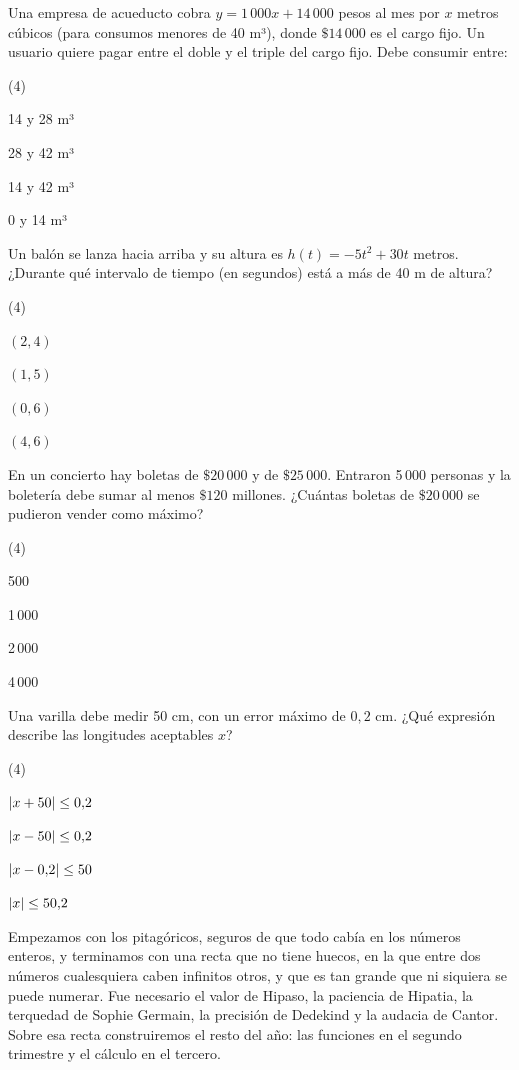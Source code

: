 \documentclass[11pt]{article}
\begin{document}
\begin{preguntas}
\pregunta Una empresa de acueducto cobra $y = 1\,000x + 14\,000$ pesos al mes por
$x$ metros cúbicos (para consumos menores de 40 m³), donde $\$14\,000$ es el cargo
fijo. Un usuario quiere pagar entre el doble y el triple del cargo fijo. Debe
consumir entre:
\begin{opciones*}(4)
  \item 14 y 28 m³
  \item 28 y 42 m³
  \item 14 y 42 m³
  \item 0 y 14 m³
\end{opciones*}
\pregunta Un balón se lanza hacia arriba y su altura es $h(t) = -5t^2 + 30t$ metros.
¿Durante qué intervalo de tiempo (en segundos) está a más de 40 m de altura?
\begin{opciones*}(4)
  \item $(2, 4)$
  \item $(1, 5)$
  \item $(0, 6)$
  \item $(4, 6)$
\end{opciones*}
\pregunta En un concierto hay boletas de $\$20\,000$ y de $\$25\,000$. Entraron
5\,000 personas y la boletería debe sumar al menos $\$120$ millones. ¿Cuántas
boletas de $\$20\,000$ se pudieron vender como máximo?
\begin{opciones*}(4)
  \item 500
  \item 1\,000
  \item 2\,000
  \item 4\,000
\end{opciones*}
\pregunta Una varilla debe medir 50 cm, con un error máximo de $0{,}2$ cm. ¿Qué
expresión describe las longitudes aceptables $x$?
\begin{opciones*}(4)
  \item $\lvert x + 50\rvert \le 0{,}2$
  \item $\lvert x - 50\rvert \le 0{,}2$
  \item $\lvert x - 0{,}2\rvert \le 50$
  \item $\lvert x\rvert \le 50{,}2$
\end{opciones*}
\end{preguntas}


Empezamos con los pitagóricos, seguros de que todo cabía en los números enteros, y
terminamos con una recta que no tiene huecos, en la que entre dos números
cualesquiera caben infinitos otros, y que es tan grande que ni siquiera se puede
numerar. Fue necesario el valor de Hipaso, la paciencia de Hipatia, la
terquedad de Sophie Germain, la precisión de Dedekind y la audacia de Cantor.
Sobre esa recta construiremos el resto del año: las funciones en el segundo
trimestre y el cálculo en el tercero.
\end{document}
